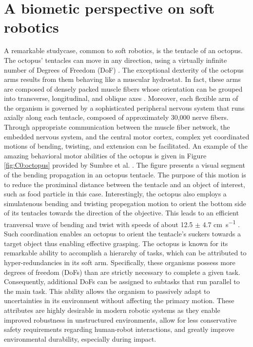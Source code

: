 \section{A biometic perspective on soft robotics}
A remarkable studycase, common to soft robotics, is the tentacle of an octopus. The octopus' tentacles can move in any direction, using a virtually infinite number of Degrees of Freedom (DoF) \cite{Sumbre2001Sep,Kier1985,Kennedy2020Nov}. The exceptional dexterity of the octopus arms results from them behaving like a muscular hydrostat. In fact, these arms are composed of densely packed muscle fibers whose orientation can be grouped into transverse, longitudinal, and oblique axes \cite{Kier2007Oct}. Moreover, each flexible arm of the organism is governed by a sophisticated peripheral nervous system that runs axially along each tentacle, composed of approximately 30,000 nerve fibers. Through appropriate communication between the muscle fiber network, the embedded nervous system, and the central motor cortex, complex yet coordinated motions of bending, twisting, and extension can be facilitated. An example of the amazing behavioral motor abilities of the octopus is given in Figure \ref{fig:C0:octopus} provided by Sumbre et al. \cite{Sumbre2001Sep}. The figure presents a visual segment of the bending propagation in an octopus tentacle. The purpose of this motion is to reduce the proximinal distance between the tentacle and an object of interest, such as food particle in this case. Interestingly, the octopus also employs a simulatenous bending and twisting propegation motion to orient the bottom side of its tentacles towards the direction of the objective. This leads to an efficient tranversal wave of bending and twist with speeds of about 12.5 $\pm$ 4.7 \si{\centi \meter \per \second} \cite{Sumbre2001Sep}. Such coordination enables an octopus to orient the tentacle's suckers towards a target object thus enabling effective grasping. The octopus is known for its remarkable ability to accomplish a hierarchy of tasks, which can be attributed to hyper-redundancies in its soft arm. Specifically, these organisms possess more degrees of freedom (DoFs) than are strictly necessary to complete a given task. Consequently, additional DoFs can be assigned to subtasks that run parallel to the main task. This ability allows the organism to passively adapt to uncertainties in its environment without affecting the primary motion. These attributes are highly desirable in modern robotic systems as they enable improved robustness in unstructured environments, allow for less conservative safety requirements regarding human-robot interactions, and greatly improve environmental durability, especially during impact.

